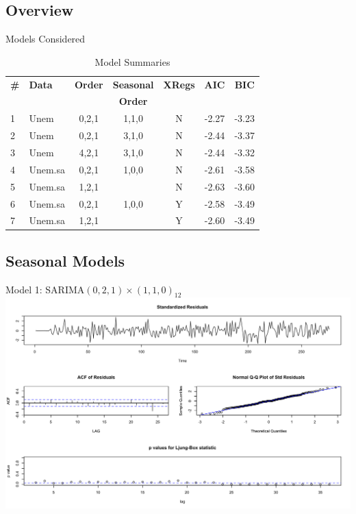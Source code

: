     \subsection{Overview}
  \begin{frame}{Models Considered}
\begin{table}[H]
\centering
\caption{Model Summaries}
\begin{tabular}{llccccc}
  \hline
 \textbf{\#}& \textbf{Data}  & \textbf{Order} & \textbf{Seasonal} & \textbf{XRegs} & \textbf{AIC} & \textbf{BIC} \\
 &&&\textbf{Order}&&&\\ 
  \hline
1 & Unem  & 0,2,1 & 1,1,0 & N & -2.27 & -3.23 \\ 
  2 & Unem  & 0,2,1 & 3,1,0 & N & -2.44 & -3.37 \\ 
  3 & Unem  & 4,2,1 & 3,1,0 & N & -2.44 & -3.32 \\ 
  4 & Unem.sa & 0,2,1 & 1,0,0 & N & -2.61 & -3.58 \\ 
  5 & Unem.sa  & 1,2,1 &  & N & -2.63 & -3.60 \\ 
  6 & Unem.sa & 0,2,1 & 1,0,0 & Y & -2.58 & -3.49 \\ 
  7 & Unem.sa  & 1,2,1 &  & Y & -2.60 & -3.49 \\ 
   \hline
\end{tabular}
\label{tab:models}
\end{table}
  \end{frame}

 \subsection{Seasonal Models}
  \begin{frame}{Model 1: SARIMA\((0,2,1) \times (1,1,0)_{12}\)}
  		\includegraphics[width=\linewidth]{images/seasonalmodel1}
  \end{frame}

